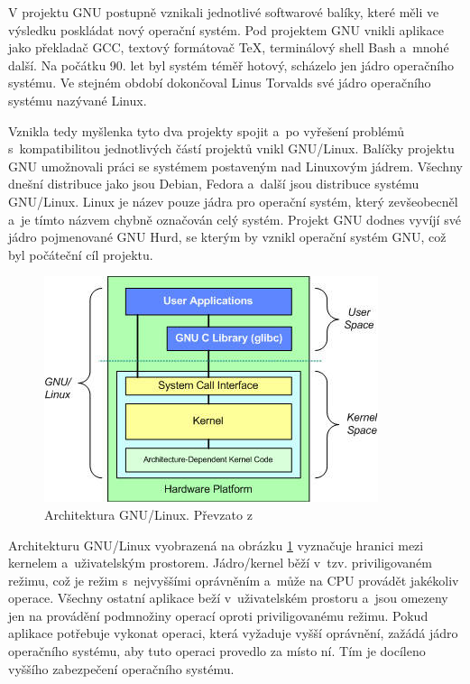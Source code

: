 V projektu GNU postupně vznikali jednotlivé softwarové balíky, které měli ve výsledku poskládat nový operační systém. Pod projektem GNU vnikli aplikace jako překladač GCC,
textový formátovač TeX, terminálový shell Bash a mnohé další. Na počátku 90. let byl systém téměř hotový, scházelo jen jádro operačního systému. Ve stejném období dokončoval
Linus Torvalds své jádro operačního systému nazývané Linux.\cite{GNULinux}\cite{GNULinux2} 

Vznikla tedy myšlenka tyto dva projekty spojit a po vyřešení problémů s kompatibilitou jednotlivých částí projektů vnikl GNU/Linux. Balíčky projektu GNU umožnovali práci
se systémem postaveným nad Linuxovým jádrem. Všechny dnešní distribuce jako jsou Debian, Fedora a další jsou distribuce systému GNU/Linux. Linux je název pouze jádra pro 
operační systém, který zevšeobecněl a je tímto názvem chybně označován celý systém. Projekt GNU dodnes vyvíjí své jádro pojmenované GNU Hurd, se kterým by vznikl operační
systém GNU, což byl počáteční cíl projektu.\cite{GNULinux2}

\begin{figure}[h]
    \centering
    \includegraphics[width=0.6\linewidth]{other-fig/userspace.jpg}
    \caption{Architektura GNU/Linux. Převzato z \cite{Userspace}}
    \label{fig:gnu_linux_architecture}
\end{figure}

Architekturu GNU/Linux vyobrazená na obrázku \ref{fig:gnu_linux_architecture} vyznačuje hranici mezi kernelem a uživatelským prostorem. Jádro/kernel běží v tzv. priviligovaném
režimu, což je režim s nejvyššími oprávněním a může na CPU provádět jakékoliv operace. Všechny ostatní aplikace beží v uživatelském prostoru a jsou omezeny jen na provádění 
podmnožiny operací oproti priviligovanému režimu. Pokud aplikace potřebuje vykonat operaci, která vyžaduje vyšší oprávnění, zažádá jádro operačního systému, aby tuto operaci 
provedlo za místo ní. Tím je docíleno vyššího zabezpečení operačního systému.

